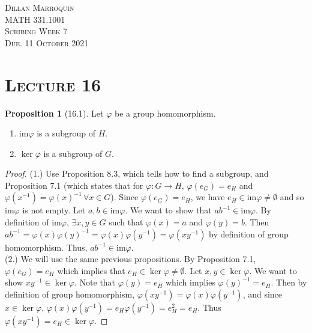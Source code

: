 \documentclass{article}
\newcommand{\es}{\emptyset}
\newcommand{\inverse}[1]{#1^{-1}}
\newcommand{\func}[3]{#1: #2 \to #3}
\theoremstyle{definition}
\newtheorem*{prop}{Proposition}
\theoremstyle{remark}
\newcommand{\im}[1]{\mathrm{im}#1}
\begin{document}
    \begin{center}
        \textsc{Dillan Marroquin\\MATH 331.1001\\Scribing Week 7\\Due. 11 October 2021\\}
    \end{center}
        
    \noindent\section*{\textbf{\textsc{Lecture 16}}}{
         \begin{prop}[16.1]
            Let $\varphi$ be a group homomorphism.
            \begin{enumerate}
                \item $\im\varphi$ is a subgroup of $H$.
                \item $\ker\varphi$ is a subgroup of $G$.
            \end{enumerate}
         \end{prop}
         
         \begin{proof}
             (1.) Use Proposition 8.3, which tells how to find a subgroup, and Proposition 7.1 (which states that for $\func{\varphi}{G}{H}, \, \varphi(e_G)=e_H$ and $\varphi(\inverse{x})=\inverse{\varphi(x)} \, \forall x\in G$).
             Since $\varphi(e_G)=e_H$, we have $e_H \in \im\varphi \neq \es$ and so $\im \varphi$ is not empty. Let $a,b \in \im \varphi$. We want to show that $a\inverse{b} \in \im\varphi$. By definition of $\im \varphi$, $\exists x,y \in G$ such that $\varphi(x)=a$ and $\varphi(y)=b$. Then $a\inverse{b}=\varphi(x)\inverse{\varphi(y)}=\varphi(x)\varphi(\inverse{y})=\varphi(x\inverse{y})$ by definition of group homomorphism. Thus, $a\inverse{b} \in \im\varphi$.\\
             (2.) We will use the same previous propositions. By Proposition 7.1, $\varphi(e_G)=e_H$ which implies that $e_H \in \ker\varphi \neq \es$. Let $x,y\in \ker\varphi$. We want to show $x\inverse{y}\in \ker\varphi$. Note that $\varphi(y)=e_H$ which implies $\inverse{\varphi(y)}=e_H$. Then by definition of group homomorphism, $\varphi(x\inverse{y})=\varphi(x)\varphi(\inverse{y})$, and since $x\in \ker\varphi, \, \varphi(x)\varphi(\inverse{y})=e_H\varphi(\inverse{y})=e_H^2=e_H$. Thus $\varphi(x\inverse{y})=e_H \in \ker\varphi$.
         \end{proof}
    }
\end{document}
